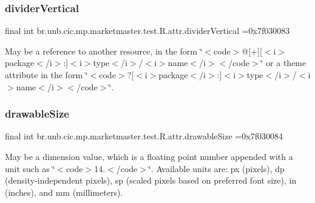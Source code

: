 \subsubsection{\texorpdfstring{divider\+Vertical}{dividerVertical}}
{\footnotesize\ttfamily final int br.\+unb.\+cic.\+mp.\+marketmaster.\+test.\+R.\+attr.\+divider\+Vertical =0x7f030083\hspace{0.3cm}{\ttfamily [static]}}

May be a reference to another resource, in the form \char`\"{}$<$code$>$@\mbox{[}+\mbox{]}\mbox{[}$<$i$>$package$<$/i$>$\+:\mbox{]}$<$i$>$type$<$/i$>$/$<$i$>$name$<$/i$>$$<$/code$>$\char`\"{} or a theme attribute in the form \char`\"{}$<$code$>$?\mbox{[}$<$i$>$package$<$/i$>$\+:\mbox{]}$<$i$>$type$<$/i$>$/$<$i$>$name$<$/i$>$$<$/code$>$\char`\"{}. \mbox{\label{classbr_1_1unb_1_1cic_1_1mp_1_1marketmaster_1_1test_1_1R_1_1attr_a205dca512339f73d9c041c7088fc0a09}} 
\subsubsection{\texorpdfstring{drawable\+Size}{drawableSize}}
{\footnotesize\ttfamily final int br.\+unb.\+cic.\+mp.\+marketmaster.\+test.\+R.\+attr.\+drawable\+Size =0x7f030084\hspace{0.3cm}{\ttfamily [static]}}

May be a dimension value, which is a floating point number appended with a unit such as \char`\"{}$<$code$>$14.\+5sp$<$/code$>$\char`\"{}. Available units are\+: px (pixels), dp (density-\/independent pixels), sp (scaled pixels based on preferred font size), in (inches), and mm (millimeters). \mbox{\label{classbr_1_1unb_1_1cic_1_1mp_1_1marketmaster_1_1test_1_1R_1_1attr_a72e80634da0a61cb059693a2e5b60c9c}} 
